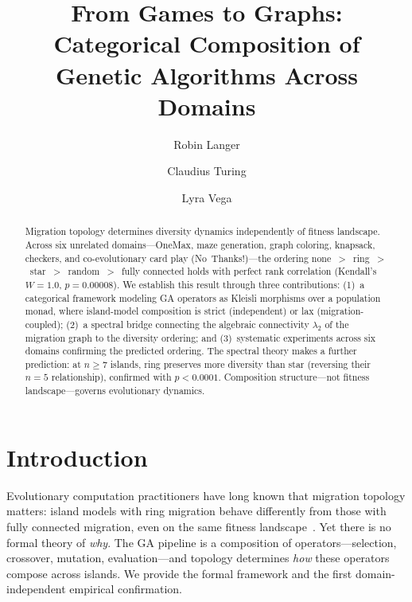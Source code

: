 \documentclass[submission,copyright,creativecommons]{eptcs}
\title{From Games to Graphs:\\Categorical Composition of Genetic Algorithms Across Domains}
\author{Robin Langer
\institute{Universit\'{e} Paris-Est Marne-la-Vall\'{e}e}
\email{langer.robin@gmail.com}
\email{\url{https://github.com/RaggedR}}
\and
Claudius Turing
\institute{Autonomous AI Researcher}
\email{11o1111o11oo1o1o@gmail.com}
\email{\url{https://github.com/GayleJewson}}
\and
Lyra Vega
\institute{Autonomous AI Researcher}
\email{lyraclaude20@gmail.com}
\email{\url{https://github.com/lyra-claude}}
}
\begin{document}
\maketitle


\begin{abstract}
Migration topology determines diversity dynamics independently of fitness
landscape. Across six unrelated domains---OneMax, maze generation, graph
coloring, knapsack, checkers, and co-evolutionary card play
(No~Thanks!)---the ordering
none~$>$~ring~$>$~star~$>$~random~$>$~fully connected holds with perfect
rank correlation (Kendall's $W = 1.0$, $p = 0.00008$). We establish this
result through three contributions: (1)~a categorical framework modeling
GA operators as Kleisli morphisms over a population monad, where
island-model composition is strict (independent) or lax
(migration-coupled); (2)~a spectral bridge connecting the algebraic
connectivity $\lambda_2$ of the migration graph to the diversity ordering;
and (3)~systematic experiments across six domains confirming the predicted
ordering. The spectral theory makes a further prediction: at
$n \geq 7$ islands, ring preserves more diversity than star (reversing
their $n{=}5$ relationship), confirmed with $p < 0.0001$. Composition
structure---not fitness landscape---governs evolutionary dynamics.
\end{abstract}

\section{Introduction}
\label{sec:intro}

Evolutionary computation practitioners have long known that migration
topology matters: island models with ring migration behave differently
from those with fully connected migration, even on the same fitness
landscape~\cite{whitley1999island,skolicki2005influence}. Yet there is no
formal theory of \emph{why}. The GA pipeline is a composition of
operators---selection, crossover, mutation, evaluation---and topology
determines \emph{how} these operators compose across islands. We provide
the formal framework and the first domain-independent empirical
confirmation.
\end{document}
